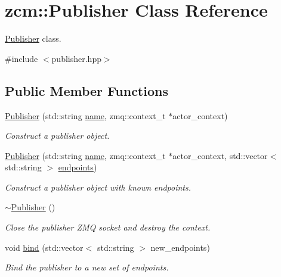 \hypertarget{classzcm_1_1Publisher}{\section{zcm\-:\-:Publisher Class Reference}
\label{classzcm_1_1Publisher}
}


\hyperlink{classzcm_1_1Publisher}{Publisher} class.  




{\ttfamily \#include $<$publisher.\-hpp$>$}

\subsection*{Public Member Functions}
\begin{DoxyCompactItemize}
\item 
\hyperlink{classzcm_1_1Publisher_a149b8b7369d1707b5cdbbcb32c5d1683}{Publisher} (std\-::string \hyperlink{classzcm_1_1Publisher_a2e3902339b55647dc6a7d2f3de64d8fe}{name}, zmq\-::context\-\_\-t $\ast$actor\-\_\-context)
\begin{DoxyCompactList}\small\item\em Construct a publisher object. \end{DoxyCompactList}\item 
\hyperlink{classzcm_1_1Publisher_aaff2cf1705bb0da2b4bb6a58b42f7263}{Publisher} (std\-::string \hyperlink{classzcm_1_1Publisher_a2e3902339b55647dc6a7d2f3de64d8fe}{name}, zmq\-::context\-\_\-t $\ast$actor\-\_\-context, std\-::vector$<$ std\-::string $>$ \hyperlink{classzcm_1_1Publisher_a34548b5f2611391263acd10cb7d197e5}{endpoints})
\begin{DoxyCompactList}\small\item\em Construct a publisher object with known endpoints. \end{DoxyCompactList}\item 
\hyperlink{classzcm_1_1Publisher_adde9cdf939d305abeec3ef98331f5f40}{$\sim$\-Publisher} ()
\begin{DoxyCompactList}\small\item\em Close the publisher Z\-M\-Q socket and destroy the context. \end{DoxyCompactList}\item 
void \hyperlink{classzcm_1_1Publisher_a74a5e00ea8b49a70e4077727b318864f}{bind} (std\-::vector$<$ std\-::string $>$ new\-\_\-endpoints)
\begin{DoxyCompactList}\small\item\em Bind the publisher to a new set of endpoints. \end{DoxyCompactList}\item 

\end{DoxyCompactItemize}
